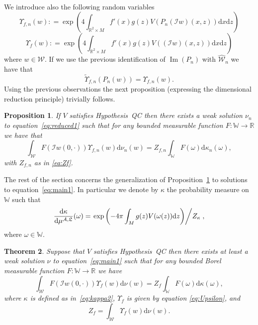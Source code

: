 \documentclass[a4paper,10pt]{article}
\newcommand{\mathd}{\mathrm{d}}
\newcommand{\tmop}[1]{\ensuremath{\operatorname{#1}}}
\newtheorem{theorem}{Theorem}
\newtheorem{proposition}[theorem]{Proposition}
{\theorembodyfont{\rmfamily}\newtheorem{remark}[theorem]{Remark}}
\begin{document}
\

We introduce also the following random variables
\begin{equation}
  \Upsilon_{f, n} (w) : = \exp \left( 4 \int_{\mathbb{R}^2 \times M} f' (x) g
  (z) V (P_n (\mathcal{I} w) (x, z)) \mathd x \mathd z \right)
\end{equation}
\begin{equation}
  \Upsilon_f (w) : = \exp \left( 4 \int_{\mathbb{R}^2 \times M} f' (x) g (z) V
  ( (\mathcal{I} w) (x, z)) \mathd x \mathd z \right)
  \label{eq:Upsilon}
\end{equation}
where $w \in \mathcal{W}$. If we use the previous identification of $\tmop{Im}
(P_n)$ with $\widehat{\mathcal{W}}_n$ we have that
\[ \tilde{\Upsilon}_{f, n} (P_n (w)) = \Upsilon_{f, n} (w) . \]
Using the previous observations the next proposition (expressing the
dimensional reduction principle) trivially follows.

\begin{proposition}
  \label{proposition_reduced1}If $V$ satisfies Hypothesis~QC then there exists
  a weak solution $\nu_n$ to equation~{\eqref{eq:reduced1}} such that for any
  bounded measurable function $F : \mathbb{W} \rightarrow \mathbb{R}$ we have
  that
  \begin{equation}
    \int_{\mathcal{W}} F (\mathcal{I} w (0, \cdot)) \Upsilon_{f, n} (w) \mathd
    \nu_n (w) = Z_{f, n} \int_{\mathbb{W}} F (\omega) \mathd \kappa_n
    (\omega), \label{eq:reduced8}
  \end{equation}
  with $Z_{f, n}$ as in {\eqref{eq:Zf}}.
\end{proposition}

The rest of the section concerns the generalization of
Proposition~\ref{proposition_reduced1} to solutions to
equation~{\eqref{eq:main1}}. In particular we denote by $\kappa$ the
probability measure on $\mathbb{W}$ such that
\begin{equation}
  \frac{\mathd \kappa}{\mathd \mu^{\mathfrak{\mathcal{A}, L}}} (\omega) =
  \left. \exp \left( - 4 \pi \int_M g (z) V (\omega (z)) \mathd z \right)
  \middle/ Z_{\kappa} \right. \label{eq:kappa2},
\end{equation}
where $\omega \in \mathbb{W}$.

\begin{theorem}
  \label{theorem_main}Suppose that $V$ satisfies Hypothesis~QC then there
  exists at least a weak solution $\nu$ to equation~{\eqref{eq:main1}} such
  that for any bounded Borel measurable function $F : \mathbb{W} \rightarrow
  \mathbb{R}$ we have
  \begin{equation}
    \int_{\mathcal{W}} F ( \mathcal{I} w (0, \cdot)) \Upsilon_f (w)
    \mathd \nu (w) = Z_f \int_{\mathbb{W}} F (\omega) \mathd \kappa (\omega)
    \label{eq:main2},
  \end{equation}
  where $\kappa$ is defined as in~{\eqref{eq:kappa2}}, $\Upsilon_f$ is given
  by equation {\eqref{eq:Upsilon}}, and
  \[ Z_f = \int_{\mathcal{W}} \Upsilon_f (w) \mathd \nu (w) . \]
\end{theorem}
\end{document}
